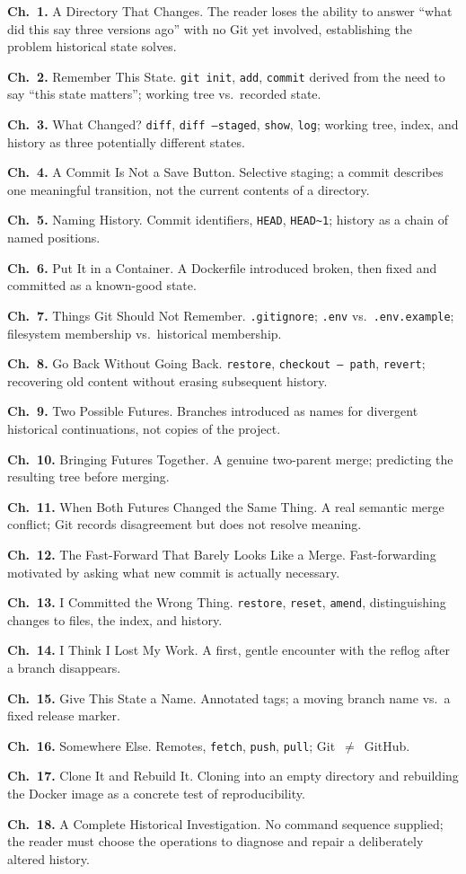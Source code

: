 \documentclass[11pt]{book}
\newcommand{\subheading}[1]{\bigskip\noindent{\bfseries\itshape #1}\smallskip\par}
\newcommand{\chapentry}[2]{\noindent\textbf{Ch.~#1.} #2\par\smallskip}
\begin{document}
\subheading{Chapter Outline}
\chapentry{1}{A Directory That Changes. The reader loses the ability to answer ``what did this say three versions ago'' with no Git yet involved, establishing the problem historical state solves.}
\chapentry{2}{Remember This State. \texttt{git init}, \texttt{add}, \texttt{commit} derived from the need to say ``this state matters''; working tree vs.\ recorded state.}
\chapentry{3}{What Changed? \texttt{diff}, \texttt{diff --staged}, \texttt{show}, \texttt{log}; working tree, index, and history as three potentially different states.}
\chapentry{4}{A Commit Is Not a Save Button. Selective staging; a commit describes one meaningful transition, not the current contents of a directory.}
\chapentry{5}{Naming History. Commit identifiers, \texttt{HEAD}, \texttt{HEAD\textasciitilde 1}; history as a chain of named positions.}
\chapentry{6}{Put It in a Container. A Dockerfile introduced broken, then fixed and committed as a known-good state.}
\chapentry{7}{Things Git Should Not Remember. \texttt{.gitignore}; \texttt{.env} vs.\ \texttt{.env.example}; filesystem membership vs.\ historical membership.}
\chapentry{8}{Go Back Without Going Back. \texttt{restore}, \texttt{checkout -- path}, \texttt{revert}; recovering old content without erasing subsequent history.}
\chapentry{9}{Two Possible Futures. Branches introduced as names for divergent historical continuations, not copies of the project.}
\chapentry{10}{Bringing Futures Together. A genuine two-parent merge; predicting the resulting tree before merging.}
\chapentry{11}{When Both Futures Changed the Same Thing. A real semantic merge conflict; Git records disagreement but does not resolve meaning.}
\chapentry{12}{The Fast-Forward That Barely Looks Like a Merge. Fast-forwarding motivated by asking what new commit is actually necessary.}
\chapentry{13}{I Committed the Wrong Thing. \texttt{restore}, \texttt{reset}, \texttt{amend}, distinguishing changes to files, the index, and history.}
\chapentry{14}{I Think I Lost My Work. A first, gentle encounter with the reflog after a branch disappears.}
\chapentry{15}{Give This State a Name. Annotated tags; a moving branch name vs.\ a fixed release marker.}
\chapentry{16}{Somewhere Else. Remotes, \texttt{fetch}, \texttt{push}, \texttt{pull}; Git~$\neq$~GitHub.}
\chapentry{17}{Clone It and Rebuild It. Cloning into an empty directory and rebuilding the Docker image as a concrete test of reproducibility.}
\chapentry{18}{A Complete Historical Investigation. No command sequence supplied; the reader must choose the operations to diagnose and repair a deliberately altered history.}
\end{document}

